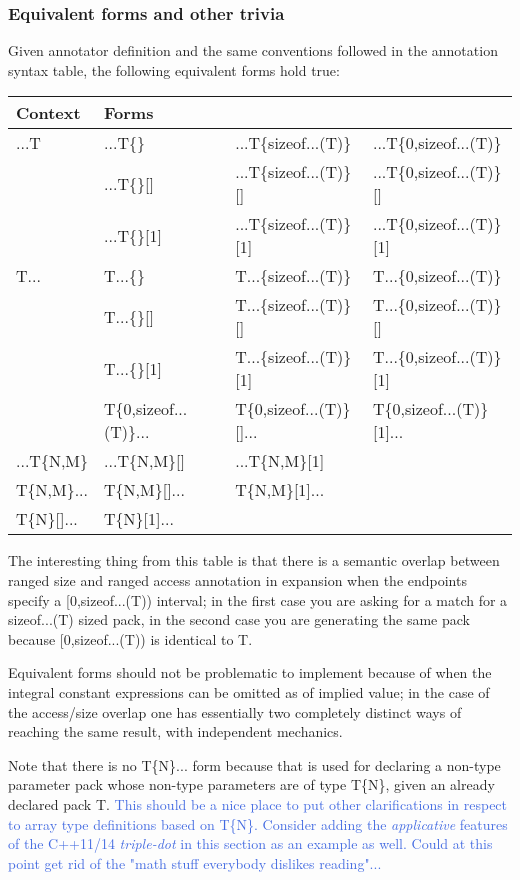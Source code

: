\subsubsection{Equivalent forms and other trivia}
\p Given annotator definition and the same conventions followed in the annotation syntax table, the following equivalent forms hold true:

\begin{tabularx}{\textwidth}{l | l l l}
  \textbf{Context} & \textbf{Forms} \\
\hline
   ...T & ...T\{\}    & ...T\{sizeof...(T)\}     & ...T\{0,sizeof...(T)\} \\
        & ...T\{\}[]  & ...T\{sizeof...(T)\}[]   & ...T\{0,sizeof...(T)\}[] \\
        & ...T\{\}[1] & ...T\{sizeof...(T)\}[1] & ...T\{0,sizeof...(T)\}[1] \\

   T... & T...\{\} & T...\{sizeof...(T)\} & T...\{0,sizeof...(T)\} \\
        & T...\{\}[] & T...\{sizeof...(T)\}[] & T...\{0,sizeof...(T)\}[] \\
        & T...\{\}[1] & T...\{sizeof...(T)\}[1] & T...\{0,sizeof...(T)\}[1] \\
        & T\{0,sizeof...(T)\}... & T\{0,sizeof...(T)\}[]... & T\{0,sizeof...(T)\}[1]... \\
\hline
 ...T\{N,M\} & ...T\{N,M\}[] & ...T\{N,M\}[1] \\
\hline
   T\{N,M\}... & T\{N,M\}[]... & T\{N,M\}[1]... \\
\hline
   T\{N\}[]... & T\{N\}[1]... \\
\end{tabularx}

\p The interesting thing from this table is that there is a semantic overlap between ranged size and ranged access annotation in expansion when the endpoints specify a [0,sizeof...(T)) interval;
in the first case you are asking for a match for a sizeof...(T) sized pack, in the second case you are generating the same pack because [0,sizeof...(T)) is identical to T.

\p Equivalent forms should not be problematic to implement because of when the integral constant expressions can be omitted as of implied value; in the case of the access/size overlap one has essentially two completely distinct ways of reaching the same result, with independent mechanics.

\p Note that there is no T\{N\}... form because that is used for declaring a non-type parameter pack whose non-type parameters are of type T\{N\}, given an already declared pack T.
\textcolor{RoyalBlue}{This should be a nice place to put other clarifications in respect to
array type definitions based on T\{N\}.
Consider adding the \textit{applicative} features of the C++11/14 \textit{triple-dot} in this section as an example as well.
Could at this point get rid of the "math stuff everybody dislikes reading"...}

